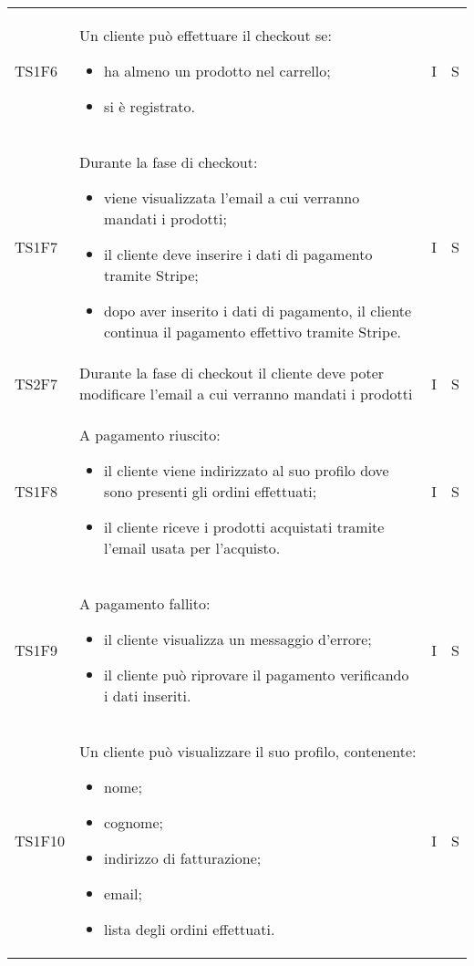 {\begin{longtable}{C{2cm} C{9.6cm} C{1.5cm} C{1cm}}
TS1F6 & Un cliente può effettuare il checkout se:
\begin{itemize}
	\item ha almeno un prodotto nel carrello;
	\item si è registrato.
\end{itemize}
& I & S\\

TS1F7 & Durante la fase di checkout:
\begin{itemize}
	\item viene visualizzata l'email a cui verranno mandati i prodotti;
	\item il cliente deve inserire i dati di pagamento tramite Stripe;
	\item dopo aver inserito i dati di pagamento, il cliente continua il pagamento effettivo tramite Stripe.
\end{itemize}
& I & S\\

TS2F7 & Durante la fase di checkout il cliente deve poter modificare l'email a cui verranno mandati i prodotti
& I & S\\

TS1F8 & A pagamento riuscito:
\begin{itemize}
	\item il cliente viene indirizzato al suo profilo dove sono presenti gli ordini effettuati;
	\item il cliente riceve i prodotti acquistati tramite l'email usata per l'acquisto.
\end{itemize}
& I & S\\

TS1F9 & A pagamento fallito:
\begin{itemize}
	\item il cliente visualizza un messaggio d'errore;
	\item il cliente può riprovare il pagamento verificando i dati inseriti.
\end{itemize}
& I & S\\


TS1F10 & Un cliente può visualizzare il suo profilo, contenente:
\begin{itemize}
	\item nome;
	\item cognome;
	\item indirizzo di fatturazione;
	\item email;
	\item lista degli ordini effettuati.
\end{itemize}
& I & S\\


\end{longtable}}
